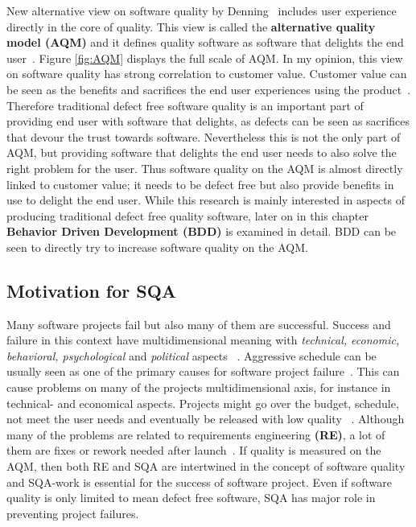     New alternative view on software quality by Denning~\cite{denning2016sq} includes user experience directly in the core of quality.
    This view is called the \textbf{alternative quality model (AQM)} and it defines quality software as software that delights
    the end user~\cite{denning2016sq}. Figure \ref{fig:AQM} displays the full scale of AQM.
    In my opinion, this view on software quality has strong correlation to customer value. Customer value can be seen as
    the benefits and sacrifices the end user experiences using the product~\cite{woodruff1997customer}. Therefore traditional
    defect free software quality is an important part of providing end user with software that delights, as defects
    can be seen as sacrifices that devour the trust towards software. Nevertheless this is not the only part of AQM,
    but providing software that delights the end user needs to also solve the right problem for the user.
    Thus software quality on the AQM is almost directly linked to customer value; it needs to be defect free but also
    provide benefits in use to delight the end user. While this research is mainly interested in aspects of producing traditional defect free quality software,
    later on in this chapter \textbf{Behavior Driven Development (BDD)} is examined in detail.
    BDD can be seen to directly try to increase software quality on the AQM.

    \subsection{Motivation for SQA}
    Many software projects fail but also many of them are successful. Success and failure in this context have multidimensional meaning with
    \textit{technical, economic, behavioral, psychological} and \textit{political} aspects ~\cite{mcleod2011factors}. Aggressive
    schedule can be usually seen as one of the primary causes for software project failure~\cite{cerpa2009did}. This can cause
    problems on many of the projects multidimensional axis, for instance in technical- and economical aspects. Projects might go
    over the budget, schedule, not meet the user needs and eventually be released with low quality ~\cite{cerpa2009did}.
    Although many of the problems are related to requirements engineering \textbf{(RE)}, a lot of them are fixes or rework needed after launch~\cite{lessons}.
    If quality is measured on the AQM, then both RE and SQA are intertwined in the concept of software quality and SQA-work
    is essential for the success of software project. Even if software quality is only limited to mean defect free software, SQA has
    major role in preventing project failures.

